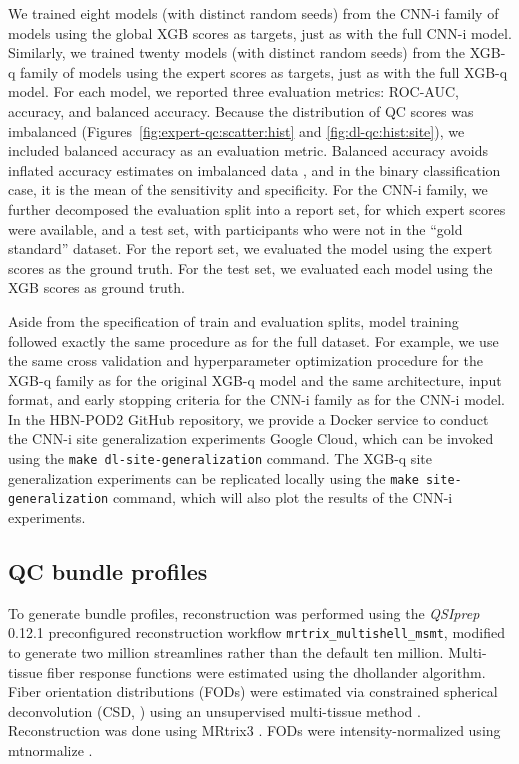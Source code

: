 \documentclass[fleqn,10pt,inline]{wlscirep}
\begin{document}
We trained eight models (with distinct random seeds) from the CNN-i family of models using the global XGB scores as targets, just as with the full CNN-i model. Similarly, we trained twenty models (with distinct random seeds) from the XGB-q family of models using the expert scores as targets, just as with the full XGB-q model. For each model, we reported three evaluation metrics: ROC-AUC, accuracy, and balanced accuracy. Because the distribution of QC scores was imbalanced (Figures~\ref{fig:expert-qc:scatter:hist} and \ref{fig:dl-qc:hist:site}), we included balanced accuracy as an evaluation metric. Balanced accuracy avoids inflated accuracy estimates on imbalanced data \cite{velez2007balanced}, and in the binary classification case, it is the mean of the sensitivity and specificity. For the CNN-i family, we further decomposed the evaluation split into a report set, for which expert scores were available, and a test set, with participants who were not in the ``gold standard'' dataset. For the report set, we evaluated the model using the expert scores as the ground truth. For the test set, we evaluated each model using the XGB scores as ground truth.

Aside from the specification of train and evaluation splits, model training followed exactly the same procedure as for the full dataset. For example, we use the same cross validation and hyperparameter optimization procedure for the XGB-q family as for the original XGB-q model and the same architecture, input format, and early stopping criteria for the CNN-i family as for the CNN-i model. In the HBN-POD2 GitHub repository, we provide a Docker
service to conduct the CNN-i site generalization experiments Google Cloud, which can be invoked using the \texttt{make dl-site-generalization} command. The XGB-q site generalization experiments can be replicated locally using the \texttt{make site-generalization} command, which will also plot the results of the CNN-i experiments.

\subsection*{QC bundle profiles}

To generate bundle profiles, reconstruction was performed using the
\emph{QSIprep} 0.12.1 preconfigured reconstruction workflow
\texttt{mrtrix\_multishell\_msmt}, modified to generate two million streamlines
rather than the default ten million. Multi-tissue fiber response functions were
estimated using the dhollander algorithm. Fiber orientation distributions (FODs) were estimated via constrained
spherical deconvolution (CSD, \cite{originalcsd, tournier2008csd}) using an
unsupervised multi-tissue method \cite{dhollander2019response,
dhollander2016unsupervised}. Reconstruction was done using MRtrix3
\cite{mrtrix3}. FODs were intensity-normalized using mtnormalize
\cite{mtnormalize}.
\end{document}
